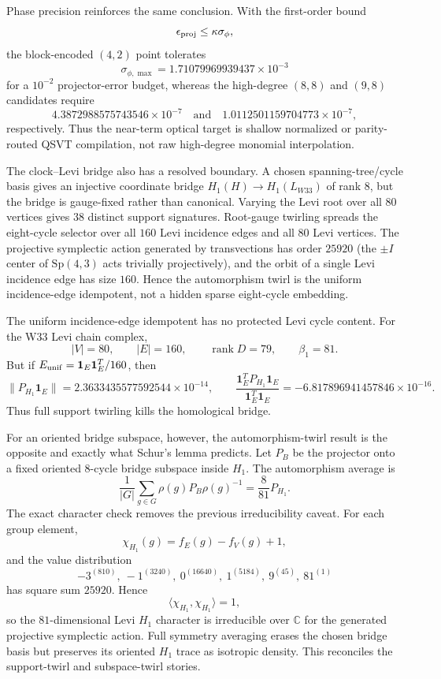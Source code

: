 Phase precision reinforces the same conclusion.  With the first-order bound
\[
\epsilon_{\rm proj}\le \kappa\sigma_\phi,
\]
the block-encoded $(4,2)$ point tolerates
\[
\sigma_{\phi,\max}=1.71079969939437\times10^{-3}
\]
for a $10^{-2}$ projector-error budget, whereas the high-degree $(8,8)$ and
$(9,8)$ candidates require
\[
4.3872988575743546\times10^{-7}
\quad\text{and}\quad
1.0112501159704773\times10^{-7},
\]
respectively.  Thus the near-term optical target is shallow normalized or
parity-routed QSVT compilation, not raw high-degree monomial interpolation.

The clock--Levi bridge also has a resolved boundary.  A chosen spanning-tree/cycle
basis gives an injective coordinate bridge $H_1(H)\to H_1(L_{W33})$ of rank $8$,
but the bridge is gauge-fixed rather than canonical.  Varying the Levi root over
all $80$ vertices gives $38$ distinct support signatures.  Root-gauge twirling
spreads the eight-cycle selector over all $160$ Levi incidence edges and all $80$
Levi vertices.  The projective symplectic action generated by transvections has
order $25920$ (the $\pm I$ center of $\mathrm{Sp}(4,3)$ acts trivially
projectively), and the orbit of a single Levi incidence edge has size $160$.
Hence the automorphism twirl is the uniform incidence-edge idempotent, not a
hidden sparse eight-cycle embedding.

The uniform incidence-edge idempotent has no protected Levi cycle content.  For
the W33 Levi chain complex,
\[
|V|=80,
\qquad
|E|=160,
\qquad
\operatorname{rank}D=79,
\qquad
\beta_1=81.
\]
But if $E_{\rm unif}=\mathbf1_E\mathbf1_E^T/160$, then
\[
\|P_{H_1}\mathbf1_E\|=2.3633435577592544\times10^{-14},
\qquad
\frac{\mathbf1_E^TP_{H_1}\mathbf1_E}{\mathbf1_E^T\mathbf1_E}
=-6.817896941457846\times10^{-16}.
\]
Thus full support twirling kills the homological bridge.

For an oriented bridge subspace, however, the automorphism-twirl result is the
opposite and exactly what Schur's lemma predicts.  Let $P_B$ be the projector onto
a fixed oriented 8-cycle bridge subspace inside $H_1$.  The automorphism average
is
\[
\frac1{|G|}\sum_{g\in G}\rho(g)P_B\rho(g)^{-1}
=\frac{8}{81}P_{H_1}.
\]
The exact character check removes the previous irreducibility caveat.  For each
group element,
\[
\chi_{H_1}(g)=f_E(g)-f_V(g)+1,
\]
and the value distribution
\[
-3^{(810)},\ -1^{(3240)},\ 0^{(16640)},\ 1^{(5184)},\ 9^{(45)},\ 81^{(1)}
\]
has square sum $25920$.  Hence
\[
\langle\chi_{H_1},\chi_{H_1}\rangle=1,
\]
so the $81$-dimensional Levi $H_1$ character is irreducible over $\mathbb C$ for
the generated projective symplectic action.  Full symmetry averaging erases the
chosen bridge basis but preserves its oriented $H_1$ trace as isotropic density.
This reconciles the support-twirl and subspace-twirl stories.

